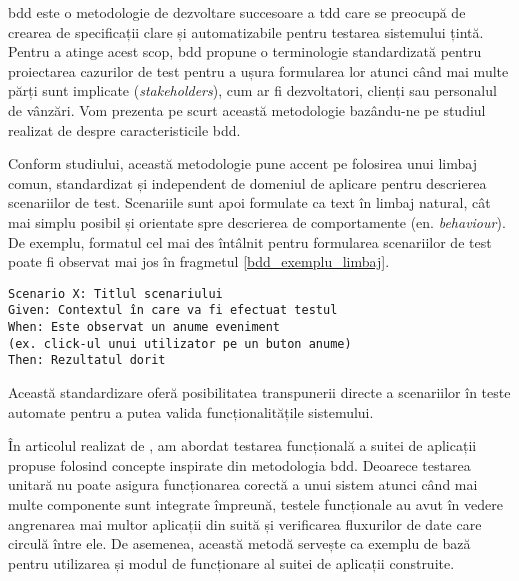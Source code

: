 \acrfull{bdd} este o metodologie de dezvoltare succesoare a \acrfull{tdd} care se preocupă de crearea de specificații clare și automatizabile pentru testarea sistemului țintă. Pentru a atinge acest scop, \acrshort{bdd} propune o terminologie standardizată pentru proiectarea cazurilor de test pentru a ușura formularea lor atunci când mai multe părți sunt implicate (\textit{stakeholders}), cum ar fi dezvoltatori, clienți sau personalul de vânzări. Vom prezenta pe scurt această metodologie bazându-ne pe studiul realizat de \citet{Solis2011} despre caracteristicile \acrshort{bdd}.

Conform studiului, această metodologie pune accent pe folosirea unui limbaj comun, standardizat și independent de domeniul de aplicare pentru descrierea scenariilor de test. Scenariile sunt apoi formulate ca text în limbaj natural, cât mai simplu posibil și orientate spre descrierea de comportamente (en. \textit{behaviour}). De exemplu, formatul cel mai des întâlnit pentru formularea scenariilor de test poate fi observat mai jos în fragmetul \ref{bdd_exemplu_limbaj}.

\begin{lstlisting}[caption={Structură comună a unui scenariu de test folosind BDD}, label={bdd_exemplu_limbaj}]
Scenario X: Titlul scenariului
Given: Contextul în care va fi efectuat testul
When: Este observat un anume eveniment 
(ex. click-ul unui utilizator pe un buton anume)
Then: Rezultatul dorit
\end{lstlisting}

Această standardizare oferă posibilitatea transpunerii directe a scenariilor în teste automate pentru a putea valida funcționalitățile sistemului.

În articolul realizat de \citet{Cristea2022}, am abordat testarea funcțională a suitei de aplicații propuse folosind concepte inspirate din metodologia \acrshort{bdd}. Deoarece testarea unitară nu poate asigura funcționarea corectă a unui sistem atunci când mai multe componente sunt integrate împreună, testele funcționale au avut în vedere angrenarea mai multor aplicații din suită și verificarea fluxurilor de date care circulă între ele. De asemenea, această metodă servește ca exemplu de bază pentru utilizarea și modul de funcționare al suitei de aplicații construite.

